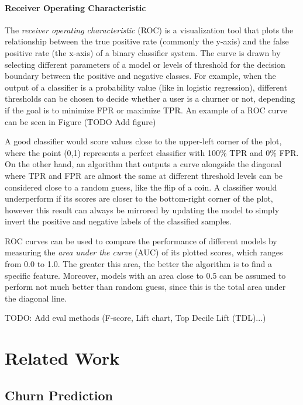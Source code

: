 \documentclass{kththesis}
\begin{document}
\subsubsection{Receiver Operating Characteristic}

The \emph{receiver operating characteristic} (ROC) is a visualization tool that plots the relationship between the true positive rate (commonly the y-axis) and the false positive rate (the x-axis) of a binary classifier system. The curve is drawn by selecting different parameters of a model or levels of threshold for the decision boundary between the positive and negative classes. For example, when the output of a classifier is a probability value (like in logistic regression), different thresholds can be chosen to decide whether a user is a churner or not, depending if the goal is to minimize FPR or maximize TPR. An example of a ROC curve can be seen in Figure (TODO Add figure)

A good classifier would score values close to the upper-left corner of the plot, where the point (0,1) represents a perfect classifier with 100\% TPR and 0\% FPR. On the other hand, an algorithm that outputs a curve alongside the diagonal where TPR and FPR are almost the same at different threshold levels can be considered close to a random guess, like the flip of a coin. A classifier would underperform if its scores are closer to the bottom-right corner of the plot, however this result can always be mirrored by updating the model to simply invert the positive and negative labels of the classified samples.

ROC curves can be used to compare the performance of different models by measuring the \emph{area under the curve} (AUC) of its plotted scores, which ranges from 0.0 to 1.0. The greater this area, the better the algorithm is to find a specific feature. Moreover, models with an area close to 0.5 can be assumed to perform not much better than random guess, since this is the total area under the diagonal line.

TODO: Add eval methods (F-score, Lift chart, Top Decile Lift (TDL)...)

\chapter{Related Work}

\section{Churn Prediction}
\end{document}
